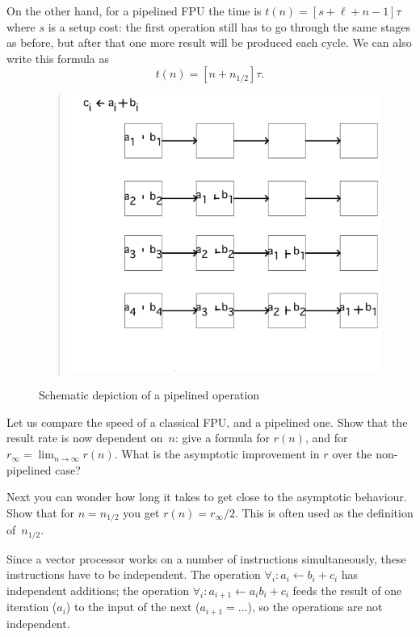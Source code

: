 On the other hand, for a pipelined \ac{FPU} the time is
$t(n)=[s+\ell+n-1]\tau$ where $s$ is a setup cost:
the first operation still has to go through the same stages
as before, but after that one more result will be
produced each cycle. We can also write this formula as
\[ t(n)=[n+n_{1/2}]\tau. \]


\begin{figure}[ht]
  \begin{quote}
  \includegraphics[scale=.12]{graphics-public/pipeline}
  \end{quote}
  \caption{Schematic depiction of a pipelined operation}
  \label{fig:pipeline}
\end{figure}
\begin{exercise}
  Let us compare the speed of a classical \ac{FPU}, and a pipelined
  one. Show that the result rate is now dependent on~$n$: give a
  formula for $r(n)$, and for
  $r_\infty=\lim_{n\rightarrow\infty}r(n)$. What is the asymptotic
  improvement in $r$ over the non-pipelined case?

  Next you can wonder how long it takes to get close to the asymptotic
  behaviour. Show that for $n=n_{1/2}$ you get $r(n)=r_\infty/2$.
  This is often used as the definition of~$n_{1/2}$.
\end{exercise}
Since a vector processor works on a number of instructions
simultaneously, these instructions have to be independent. The
operation $\forall_i\colon a_i\leftarrow b_i+c_i$ has independent
additions; the operation $\forall_i\colon a_{i+1}\leftarrow
a_ib_i+c_i$ feeds the result of one iteration ($a_i$) to the input of
the next ($a_{i+1}=\ldots$), so
the operations are not independent. 

